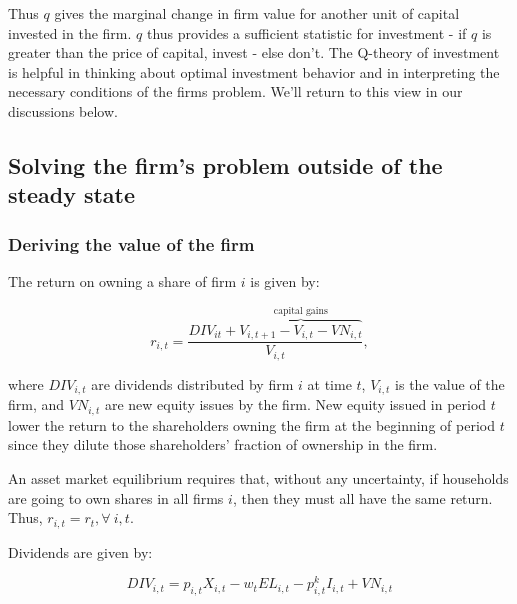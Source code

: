 \documentclass[letterpaper,12pt]{article}
\theoremstyle{definition}
\begin{document}
\begin{spacing}{1.5}
Thus $q$ gives the marginal change in firm value for another unit of capital invested in the firm.  $q$ thus provides a sufficient statistic for investment - if $q$ is greater than the price of capital, invest - else don't.  The Q-theory of investment is helpful in thinking about optimal investment behavior and in interpreting the necessary conditions of the firms problem.  We'll return to this view in our discussions below.

%
%
%


\subsection*{Solving the firm's problem outside of the steady state}

\subsubsection*{Deriving the value of the firm}

The return on owning a share of firm $i$ is given by:

\begin{equation}
\label{eqn:r_firm_i}
r_{i,t} = \frac{DIV_{it} + \overbrace{V_{i,t+1}-V_{i,t}-VN_{i,t}}^{\text{capital gains}}}{V_{i,t}}, 
\end{equation}

\noindent\noindent where $DIV_{i,t}$ are dividends distributed by firm $i$ at time $t$, $V_{i,t}$ is the value of the firm, and $VN_{i,t}$ are new equity issues by the firm.  New equity issued in period $t$ lower the return to the shareholders owning the firm at the beginning of period $t$ since they dilute those shareholders' fraction of ownership in the firm.  

An asset market equilibrium requires that, without any uncertainty, if households are going to own shares in all firms $i$, then they must all have the same return.  Thus, $r_{i,t}=r_{t}, \forall \ i,t$.

Dividends are given by:

\begin{equation}
\label{eqn:divs}
DIV_{i,t} = p_{i,t}X_{i,t}-w_{t}EL_{i,t}-p^{k}_{i,t}I_{i,t}+VN_{i,t}
\end{equation}


\end{spacing}
\end{document}
